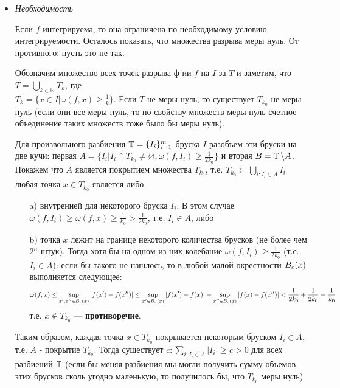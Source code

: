 \documentclass[a4paper, 10pt]{article}
\begin{document}
\proof 
\begin{itemize}
    \item \textit{Необходимость}
    
     Если $f$ интегрируема, то она ограничена по необходимому условию интегрируемости. Осталось показать, что множества разрыва меры нуль. От противного: пусть это не так.

    Обозначим множество всех точек разрыва ф-ии $f$ на $I$ за $T$ и заметим, что $T = \displaystyle\bigcup_{k\in\mathbb{N}}T_k$, где\\
    $T_k = \{x\in I | \omega(f, x) \ge \frac{1}{k}\}$. Если $T$ не меры нуль, то существует $T_{k_0}$ не меры нуль (если они все меры нуль, то по свойству множеств меры нуль счетное объединение таких множеств тоже было бы меры нуль).

    Для произвольного разбиения $\operatorname{\mathbb{T}} = \{I_i\}_{i=1}^m$ бруска $I$ разобъем эти бруски на две кучи: первая $A = \{I_i | I_i\cap T_{k_0} \ne \varnothing, \omega(f, I_i) \ge \frac{1}{2k_0}\}$ и вторая $B = \operatorname{\mathbb{T}}\backslash A$. Покажем что $A$ является покрытием множества $T_{k_0}$, т.е. $T_{k_0} \subset \displaystyle\bigcup_{i: I_i\in A} I_i$ любая точка $x\in T_{k_0}$ является либо
    \begin{itemize}
        \item[a)] внутренней для некоторого бруска $I_i$. В этом случае $\omega(f, I_i) \ge \omega(f, x) \ge \frac{1}{k_0} > \frac{1}{2k_0}$, т.е. $I_i \in A$, либо
        \item[b)] точка $x$ лежит на границе некоторого количества брусков (не более чем $2^n$ штук). Тогда хотя бы на одном из них колебание $\omega(f, I_i) \ge \frac{1}{2k_0}$ (т.е. $I_i \in A$): если бы такого не нашлось, то в любой малой окрестности $B_{\operatorname{\varepsilon}}(x)$ выполняется следующее:
        \begin{equation*}
            \omega(f, x) \le \sup_{x', x''\in B_{\operatorname{\varepsilon}}(x)} |f(x')-f(x'')| \le \sup_{x'\in B_{\operatorname{\varepsilon}}(x)}|f(x')-f(x)| + \sup_{x''\in B_{\operatorname{\varepsilon}}(x)}|f(x)-f(x'')| < \frac{1}{2k_0} + \frac{1}{2k_0} = \frac{1}{k_0}
        \end{equation*}
        т.е. $x\not\in T_{k_0}$ --- \textbf{противоречие}.
    \end{itemize}

    Таким образом, каждая точка $x\in T_{k_0}$ покрывается некоторым бруском $I_i \in A$, т.е. $A$ - покрытие $T_{k_0}$. Тогда существует $c: \displaystyle\sum_{i:I_i\in A}|I_i| \ge c > 0$ для всех разбиений $\operatorname{\mathbb{T}}$ (если бы меняя разбиения мы могли получить сумму объемов этих брусков сколь угодно маленькую, то получилось бы, что $T_{k_0}$ меры нуль)


\end{itemize}
\end{document}
